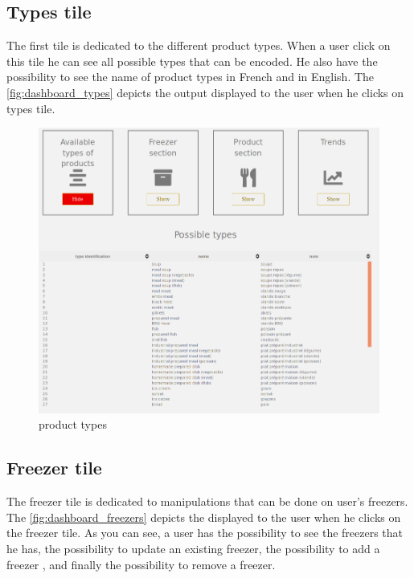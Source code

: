 \subsection{Types tile}
The first tile is dedicated to the different product types. When a user click on this tile he can see all possible types that can be encoded. He also have the possibility to see the name of product types in French and in English.
The \autoref{fig:dashboard_types} depicts the output displayed to the user when he clicks on types tile.

\begin{figure}[H]
\centering
\includegraphics[scale=0.30]{./images/dashboard_types.png}
\caption{product types}
\label{fig:dashboard_types}
\end{figure}

\subsection{Freezer tile}
The freezer tile is dedicated to manipulations that can be done on user's freezers. The \autoref{fig:dashboard_freezers} depicts the displayed to the user when he clicks on the freezer tile. As you can see, a user has the possibility to see the freezers that he has, the possibility to update an existing freezer, the possibility to add a freezer , and finally the possibility to remove a freezer.

